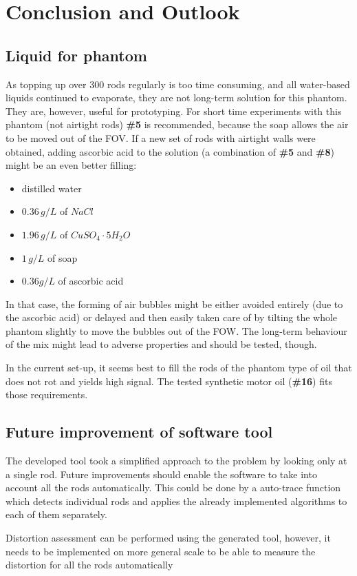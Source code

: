 
\chapter{Conclusion and Outlook}
\section{Liquid for phantom}

As topping up over 300 rods regularly is too time consuming, and all water-based liquids continued to evaporate, they are not long-term solution for this phantom.
They are, however, useful for prototyping.
For short time experiments with this phantom (not airtight rods) \textbf{\#5} is recommended, because the soap allows the air to be moved out of the FOV.
If a new set of rods with airtight walls were obtained, adding ascorbic acid to the solution (a combination of \textbf{\#5} and \textbf{\#8}) might be an even better filling:
\begin{itemize}
\item  distilled water
\item  $0.36 \, g/L$ of $NaCl$
\item  $1.96 \, g/L$ of $CuSO_4\cdot5H_2O$
\item  $1 \, g/L$ of soap
\item  $0.36 g/L$ of ascorbic acid
\end{itemize}
In that case, the forming of air bubbles might be either avoided entirely (due to the ascorbic acid) or delayed and then easily taken care of by tilting the whole phantom slightly to move the bubbles out of the FOW.
The long-term behaviour of the mix might lead to adverse properties and should be tested, though.

In the current set-up, it seems best to fill the rods of the phantom type of oil that does not rot and yields high signal.
The tested synthetic motor oil (\textbf{\#16}) fits those requirements.


    
\section{Future improvement of software tool}

The developed tool took a simplified approach to the problem by looking only at a single rod.
Future improvements should enable the software to take into account all the rods automatically.
This could be done by a auto-trace function which detects individual rods and applies the already implemented algorithms to each of them separately. 

Distortion assessment can be performed using the generated tool, however, it needs to be implemented on more general scale to be able to measure the distortion for all the rods automatically
